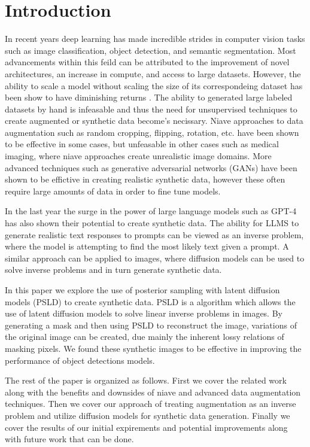 \documentclass{article}
\begin{document}
\section{Introduction}
\label{introdcution}

In recent years deep learning has made incredible strides in computer vision tasks such as image classification,
object detection, and semantic segmentation. Most advancements within this feild can be attributed to the improvement
of novel architectures, an increase in compute, and access to large datasets. However, the ability to scale a model
without scaling the size of its correspondeing dataset has been show to have diminishing returns \cite{2001.08361}.
The ability to generated large labeled datasets by hand is infeasable and thus the need for unsupervised techniques to create
augmented or synthetic data become's necissary. Niave approaches to data augmentation such as random cropping, flipping,
rotation, etc. have been shown to be effective in some cases, but unfeasable in other cases such as medical imaging, where
niave approaches create unrealistic image domains. More advanced techniques such as generative adversarial networks (GANs)
have been shown to be effictive in creating realistic synthetic data, however these often require large amounts of data in
order to fine tune models.

In the last year the surge in the power of large language models such as GPT-4 has also shown their potential to create synthetic
data. The ability for LLMS to generate realistic text responses to prompts can be viewed as an inverse problem, where the model is attempting
to find the most likely text given a prompt. A similar approach can be applied to images, where diffusion models can be used to solve
inverse problems and in turn generate synthetic data.

In this paper we explore the use of posterior sampling with latent diffusion models (PSLD) to create synthetic data. PSLD
is a algorithm which allows the use of latent diffusion models to solve linear inverse problems in images. By
generating a mask and then using PSLD to reconstruct the image, variations of the original image can be created,
due mainly the inherent lossy relations of masking pixels. We found these synthetic images to be effective in improving
the performance of object detections models.

The rest of the paper is organized as follows. First we cover the related work along with the benefits and downsides of niave and advanced data
augmentation techniques. Then we cover our approach of treating augmentation as an inverse problem and utilize diffusion
models for synthetic data generation. Finally we cover the results of our initial expirements and potential improvements along
with future work that can be done.
 
\end{document}
